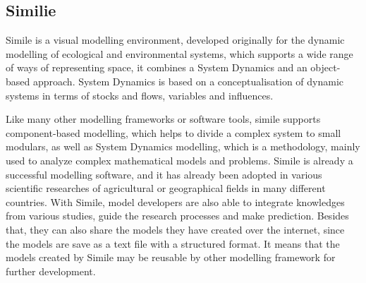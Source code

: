 \subsection{Similie}\label{sec:similie}
\par
Simile is a visual modelling environment, developed originally for the dynamic modelling of ecological and environmental systems, which supports a wide range of ways of representing space, it combines a System Dynamics and an object-based approach. System Dynamics is based on a conceptualisation of dynamic systems in terms of stocks and flows, variables and influences. \autocite{dsl:simile-simulistics}
\par
Like many other modelling frameworks or software tools, simile supports component-based modelling, which helps to divide a complex system to small modulars, as well as System Dynamics modelling, which is a methodology, mainly used to analyze complex mathematical models and problems. Simile is already a successful modelling software, and it has already been adopted in various scientific researches of agricultural or geographical fields in many different countries. With Simile, model developers are also able to integrate knowledges from various studies, guide the research processes and make prediction. Besides that, they can also share the models they have created over the internet, since the models are save as a text file with a structured format. \autocite{dsl:simile-muetzelfeldt} It means that the models created by Simile may be reusable by other modelling framework for further development.
